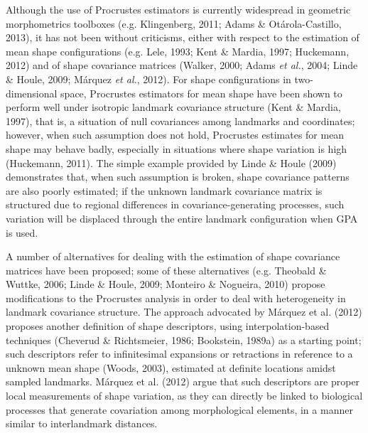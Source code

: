\documentclass[11pt,twoside]{report}
\begin{document}
Although the use of Procrustes estimators is currently widespread in
geometric morphometrics toolboxes (e.g. Klingenberg, 2011; Adams \&
Otárola-Castillo, 2013), it has not been without criticisms, either with
respect to the estimation of mean shape configurations (e.g. Lele, 1993;
Kent \& Mardia, 1997; Huckemann, 2012) and of shape covariance matrices
(Walker, 2000; Adams \emph{et al.}, 2004; Linde \& Houle, 2009; Márquez
\emph{et al.}, 2012). For shape configurations in two-dimensional space,
Procrustes estimators for mean shape have been shown to perform well
under isotropic landmark covariance structure (Kent \& Mardia, 1997),
that is, a situation of null covariances among landmarks and
coordinates; however, when such assumption does not hold, Procrustes
estimates for mean shape may behave badly, especially in situations
where shape variation is high (Huckemann, 2011). The simple example
provided by Linde \& Houle (2009) demonstrates that, when such
assumption is broken, shape covariance patterns are also poorly
estimated; if the unknown landmark covariance matrix is structured due
to regional differences in covariance-generating processes, such
variation will be displaced through the entire landmark configuration
when GPA is used.

A number of alternatives for dealing with the estimation of shape
covariance matrices have been proposed; some of these alternatives (e.g.
Theobald \& Wuttke, 2006; Linde \& Houle, 2009; Monteiro \& Nogueira,
2010) propose modifications to the Procrustes analysis in order to deal
with heterogeneity in landmark covariance structure. The approach
advocated by Márquez et al. (2012) proposes another definition of shape
descriptors, using interpolation-based techniques (Cheverud \&
Richtsmeier, 1986; Bookstein, 1989a) as a starting point; such
descriptors refer to infinitesimal expansions or retractions in
reference to a unknown mean shape (Woods, 2003), estimated at definite
locations amidst sampled landmarks. Márquez et al. (2012) argue that
such descriptors are proper local measurements of shape variation, as
they can directly be linked to biological processes that generate
covariation among morphological elements, in a manner similar to
interlandmark distances.
\end{document}
